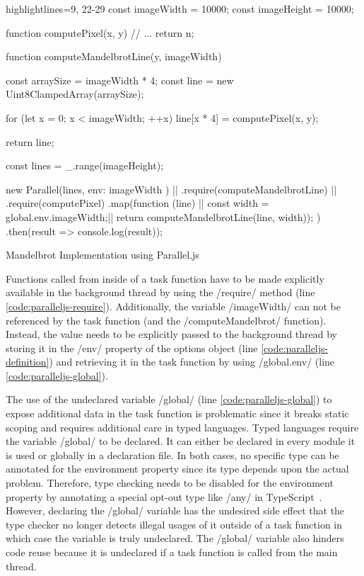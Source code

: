 \begin{listing}
	\begin{javascriptcode*}{highlightlines={9, 22-29}}
const imageWidth = 10000;
const imageHeight = 10000;

function computePixel(x, y) {
	// ...
	return n;
}

function computeMandelbrotLine(y, imageWidth) {
	const arraySize = imageWidth * 4;
	const line = new Uint8ClampedArray(arraySize);
	
	for (let x = 0; x < imageWidth; ++x) {
		line[x * 4] = computePixel(x, y);
	}
	
	return line;
}

const lines = _.range(imageHeight);

new Parallel(lines, { env: { imageWidth } }) |$\label{code:paralleljs-definition}$|
	.require(computeMandelbrotLine) |$\label{code:paralleljs-require}$|
	.require(computePixel)
	.map(function (line) { |$\label{code:paralleljs-map}$|
		const width = global.env.imageWidth;|$\label{code:paralleljs-global}$|
		return computeMandelbrotLine(line, width));
	})
	.then(result => console.log(result));
\end{javascriptcode*}

\caption{Mandelbrot Implementation using Parallel.js}
\label{fig:mandelbrot-paralleljs}
\end{listing}

Functions called from inside of a task function have to be made explicitly available in the background thread by using the \javascriptinline/require/ method (line \ref{code:paralleljs-require}). Additionally, the variable \javascriptinline/imageWidth/ can not be referenced by the task function (and the \javascriptinline/computeMandelbrot/ function). Instead, the value needs to be explicitly passed to the background thread by storing it in the \javascriptinline/env/ property of the options object (line \ref{code:paralleljs-definition}) and retrieving it in the task function by using \javascriptinline/global.env/ (line \ref{code:paralleljs-global}).


The use of the undeclared variable \javascriptinline/global/ (line \ref{code:paralleljs-global}) to expose additional data in the task function is problematic since it breaks static scoping and requires additional care in typed languages. Typed languages require the variable \javascriptinline/global/ to be declared. It can either be declared in every module it is used or globally in a declaration file. In both cases, no specific type can be annotated for the environment property since its type depends upon the actual problem. Therefore, type checking needs to be disabled for the environment property by annotating a special opt-out type like \javascriptinline/any/ in TypeScript~\cite{typescript}. However, declaring the \javascriptinline/global/ variable has the undesired side effect that the type checker no longer detects illegal usages of it outside of a task function in which case the variable is truly undeclared. The \javascriptinline/global/ variable also hinders code reuse because it is undeclared if a task function is called from the main thread.

